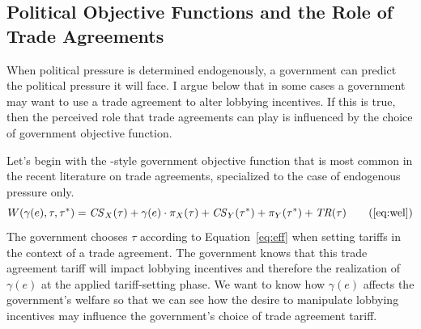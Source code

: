 \documentclass[12pt]{article}
\newtheorem{assumption}{Assumption}
\newcommand{\ve}{\theta}
\newcommand{\ga}{\gamma}
\begin{document}





\subsection{Political Objective Functions and the Role of Trade Agreements}
\label{sec:objfcn}
When political pressure is determined endogenously, a government can predict the political pressure it will face. I argue below that in some cases a government may want to use a trade agreement to alter lobbying incentives. If this is true, then the perceived role that trade agreements can play is influenced by the choice of government objective function.

Let's begin with the \Textcite{baldwin}-style government objective function that is most common in the recent literature on trade agreements, specialized to the case of endogenous pressure only.
\begin{equation}
  W(\ga(e),\tau,\tau^*) = \mathit{CS}_X(\tau) + \ga(e) \cdot \pi_X(\tau) + \mathit{CS}_Y(\tau^*) + \pi_Y(\tau^*) + \mathit{TR}(\tau)
  \tag{\ref{eq:wel}}
\end{equation}
The government chooses $\tau$ according to Equation~\ref{eq:eff} when setting tariffs in the context of a trade agreement. The government knows that this trade agreement tariff will impact lobbying incentives and therefore the realization of $\ga(e)$ at the applied tariff-setting phase. We want to know how $\ga(e)$ affects the government's welfare so that we can see how the desire to manipulate lobbying incentives may influence the government's choice of trade agreement tariff.
\end{document}
